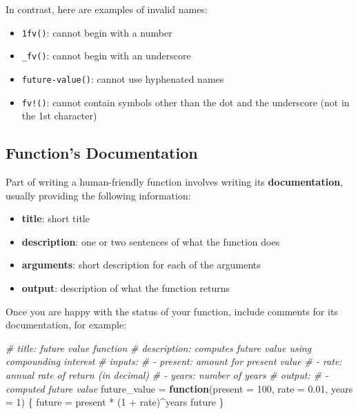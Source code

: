 \documentclass[
]{book}
\newenvironment{Shaded}{\begin{snugshade}}{\end{snugshade}}
\newcommand{\AttributeTok}[1]{\textcolor[rgb]{0.77,0.63,0.00}{#1}}
\newcommand{\CommentTok}[1]{\textcolor[rgb]{0.56,0.35,0.01}{\textit{#1}}}
\newcommand{\ControlFlowTok}[1]{\textcolor[rgb]{0.13,0.29,0.53}{\textbf{#1}}}
\newcommand{\DecValTok}[1]{\textcolor[rgb]{0.00,0.00,0.81}{#1}}
\newcommand{\FloatTok}[1]{\textcolor[rgb]{0.00,0.00,0.81}{#1}}
\newcommand{\NormalTok}[1]{#1}
\newcommand{\OtherTok}[1]{\textcolor[rgb]{0.56,0.35,0.01}{#1}}
\newcommand{\SpecialCharTok}[1]{\textcolor[rgb]{0.00,0.00,0.00}{#1}}
\begin{document}
In contrast, here are examples of invalid names:

\begin{itemize}
\item
  \texttt{1fv()}: cannot begin with a number
\item
  \texttt{\_fv()}: cannot begin with an underscore
\item
  \texttt{future-value()}: cannot use hyphenated names
\item
  \texttt{fv!()}: cannot contain symbols other than the dot and the underscore
  (not in the 1st character)
\end{itemize}

\hypertarget{functions-documentation}{%
\subsection{Function's Documentation}\label{functions-documentation}}

Part of writing a human-friendly function involves writing its
\textbf{documentation}, usually providing the following information:

\begin{itemize}
\item
  \textbf{title}: short title
\item
  \textbf{description}: one or two sentences of what the function does
\item
  \textbf{arguments}: short description for each of the arguments
\item
  \textbf{output}: description of what the function returns
\end{itemize}

Once you are happy with the status of your function, include comments for its
documentation, for example:

\begin{Shaded}
\begin{Highlighting}[]
\CommentTok{\# title: future value function}
\CommentTok{\# description: computes future value using compounding interest}
\CommentTok{\# inputs:}
\CommentTok{\# {-} present: amount for present value}
\CommentTok{\# {-} rate: annual rate of return (in decimal)}
\CommentTok{\# {-} years: number of years}
\CommentTok{\# output:}
\CommentTok{\# {-} computed future value}
\NormalTok{future\_value }\OtherTok{=} \ControlFlowTok{function}\NormalTok{(}\AttributeTok{present =} \DecValTok{100}\NormalTok{, }\AttributeTok{rate =} \FloatTok{0.01}\NormalTok{, }\AttributeTok{years =} \DecValTok{1}\NormalTok{) \{}
\NormalTok{  future }\OtherTok{=}\NormalTok{ present }\SpecialCharTok{*}\NormalTok{ (}\DecValTok{1} \SpecialCharTok{+}\NormalTok{ rate)}\SpecialCharTok{\^{}}\NormalTok{years}
\NormalTok{  future}
\NormalTok{\}}
\end{Highlighting}
\end{Shaded}
\end{document}

